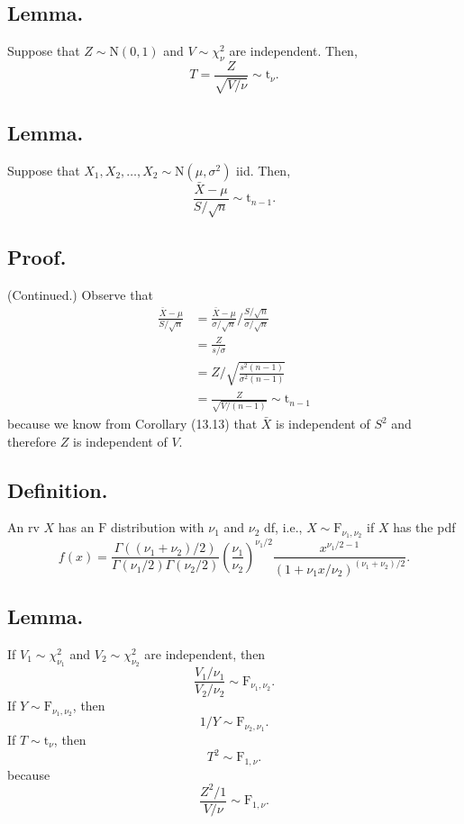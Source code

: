 \documentclass[titlepage]{article}
\begin{document}
\subsection{Lemma.} Suppose that $Z \sim \text{N}(0, 1)$ and $V \sim \chi_{\nu}^{2}$ are independent. Then, 
$$T = \frac{Z}{\sqrt{V/\nu}} \sim \text{t}_{\nu}.$$

\subsection{Lemma.} Suppose that $X_{1}, X_{2}, \ldots, X_{2} \sim \text{N}(\mu, \sigma^{2})$ iid. Then, 
$$\frac{\bar{X} - \mu}{S/\sqrt{n}} \sim \text{t}_{n-1}.$$

\subsection{Proof.} (Continued.) Observe that 
\begin{align*}
    \frac{\bar{X}-\mu}{S/\sqrt{n}} &= \frac{\bar{X}-\mu}{\sigma/\sqrt{n}}/\frac{S/\sqrt{n}}{\sigma/\sqrt{n}} \\
                                   &= \frac{Z}{s/\sigma} \\
                                   &= Z/\sqrt{\frac{s^{2}(n-1)}{\sigma^{2}(n-1)}} \\
                                   &= \frac{Z}{\sqrt{V/(n-1)}} \sim \text{t}_{n-1}
\end{align*}
because we know from Corollary (13.13) that $\bar{X}$ is independent of $S^{2}$ and therefore $Z$ is independent of $V$.

\subsection{Definition.} An rv $X$ has an $\text{F}$ distribution with $\nu_{1}$ and $\nu_{2}$ df, i.e., $X \sim \text{F}_{\nu_{1}, \nu_{2}}$ if $X$ has the pdf 
$$f(x) = \frac{\Gamma((\nu_{1}+\nu_{2})/2)}{\Gamma(\nu_{1}/2)\Gamma(\nu_{2}/2)}\left(\frac{\nu_{1}}{\nu_{2}}\right)^{\nu_{1}/2}\frac{x^{\nu_{1}/2-1}}{(1 + \nu_{1}x/\nu_{2})^{(\nu_{1}+\nu_{2})/2}}.$$

\subsection{Lemma.} If $V_{1} \sim \chi_{\nu_{1}}^{2}$ and $V_{2} \sim \chi_{\nu_{2}}^{2}$ are independent, then
$$\frac{V_{1}/\nu_{1}}{V_{2}/\nu_{2}} \sim \text{F}_{\nu_{1}, \nu_{2}}.$$
If $Y \sim \text{F}_{\nu_{1}, \nu_{2}}$, then 
$$1/Y \sim \text{F}_{\nu_{2}, \nu_{1}}.$$
If $T \sim \text{t}_{\nu}$, then 
$$T^{2} \sim \text{F}_{1, \nu}.$$
because 
$$\frac{Z^{2}/1}{V/\nu} \sim \text{F}_{1, \nu}.$$
\end{document}
